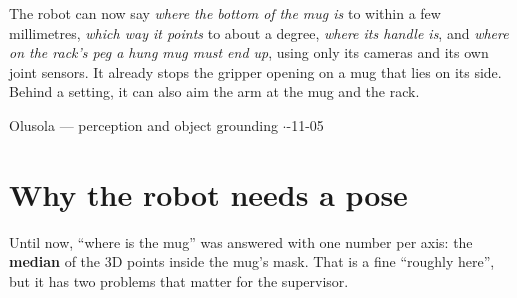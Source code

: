 \documentclass[11pt,a4paper]{article}
\begin{document}
\begin{titlepage}
\vfill
\begin{keyidea}
The robot can now say \emph{where the bottom of the mug is} to within a few millimetres,
\emph{which way it points} to about a degree, \emph{where its handle is}, and \emph{where on the
rack's peg a hung mug must end up}, using only its cameras and its own joint sensors. It
already stops the gripper opening on a mug that lies on its side. Behind a setting, it can
also aim the arm at the mug and the rack.
\end{keyidea}
\vspace{0.4cm}
{\color{stone}Olusola --- perception and object grounding \quad$\cdot$-11-05\par}
\end{titlepage}

\tableofcontents
\newpage

\section{Why the robot needs a pose}

Until now, ``where is the mug'' was answered with one number per axis: the \textbf{median}
of the 3D points inside the mug's mask. That is a fine ``roughly here'', but it has two problems
that matter for the supervisor.
\end{document}
